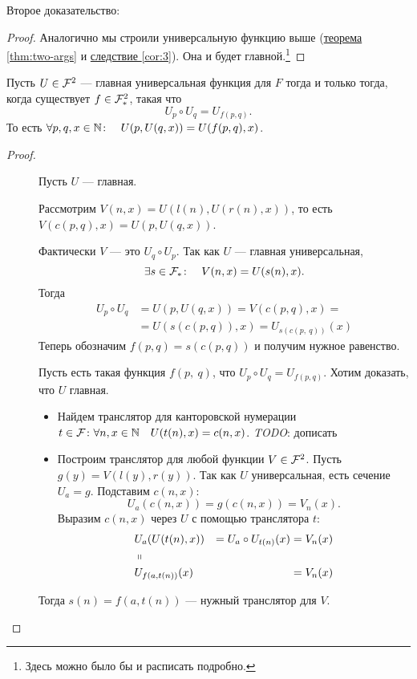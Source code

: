 \noindent 
Второе доказательство:
\begin{proof}
	Аналогично мы строили универсальную функцию выше (\hyperref[thm:two-args]{теорема \ref{thm:two-args}} и \hyperref[cor:3]{следствие \ref{cor:3}}). Она и будет главной.\footnote{Здесь можно было бы и  расписать подробно.}
\end{proof}


\begin{thm}
    Пусть $ U \in \mathcal{F}^2 $ --- главная универсальная функция для $ F$ тогда и только тогда, когда существует $ f \in \mathcal{F}^2_{*}$, такая что
	\[
		U_p \circ U_q = U_{f(p, q)}
	.\] 
	То есть $ \forall p, q, x \in \mathbb{N} \colon \quad U(p, U(q, x)) = U(f(p, q), x)$.
\end{thm}

\begin{proof}
    ~\begin{description}
		\item[] 
			Пусть $ U$ --- главная.

			Рассмотрим $ V(n, x) = U(l(n), U(r(n), x))$, то есть  $ V(c(p, q), x) = U(p, U(q, x))$. 

			Фактически $ V$ --- это $ U_q \circ U_p$.
			Так как $ U$ --- главная универсальная, 
			\[
				\exists s \in \mathcal{F}_{*} \colon \quad V(n, x) = U(s(n), x)
			.\] 
			Тогда
			\begin{align*}
				U_p \circ U_q &= U(p, U(q, x)) = V(c(p, q), x) = \\
							  &= U(s(c(p, q)), x) = U_{s(c(p,\: q))} (x) \tag{По определению транслятора}  
			\end{align*}
			Теперь обозначим $ f(p, q) = s(c(p, q))$ и получим нужное равенство.
		\item []
			\begin{proof*}
				Пусть есть такая функция $ f(p,~ q)$, что $ U_p \circ U_q = U_{f(p, q)}$. Хотим доказать, что $ U$ главная.
				\begin{itemize}
					\item Найдем транслятор для канторовской нумерации $ t \in \mathcal{F}\colon \forall n, x \in \mathbb{N} \quad U(t(n), x) = c(n, x)$.
						\textit{
						TODO}: дописать
					\item Построим транслятор для любой функции $ V \in \mathcal{F}^2$.
						Пусть $ g(y) = V(l(y), r(y))$. Так как  $ U$ универсальная, есть сечение $ U_a = g$. Подставим  $ c(n, x)$:
						\[
							U_{a}(c(n, x)) = g(c(n, x)) = V_n(x)
						.\] 
						Выразим $ c(n, x)$ через $ U$ с помощью транслятора $ t$:
						\[
						\begin{aligned}
							&U_{a}(U(t(n), x)) &= U_a \circ U_{t(n)}(x) = V_n(x) \\
							&\shortparallel \\
							&U_{f(a, t(n))}(x) &= V_n(x)
						\end{aligned}
					\]
				\end{itemize}
				Тогда $ s(n) = f(a, t(n))$ --- нужный транслятор для  $ V$.
			\end{proof*}
    \end{description} 
\end{proof}

